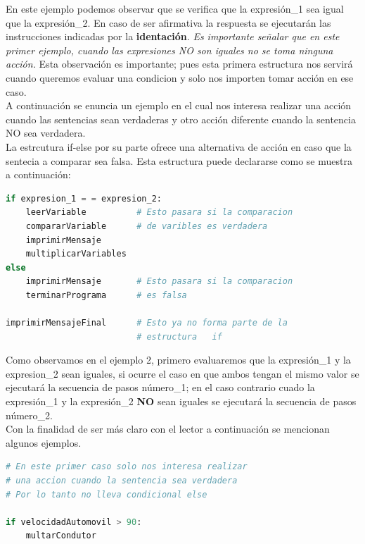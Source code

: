 \documentclass[a4paper, openright, 12pt]{article}
\begin{document}
    En este ejemplo podemos observar que se verifica que la expresión\_1 sea igual que la expresión\_2. En caso de ser afirmativa la respuesta se ejecutarán las instrucciones indicadas por la \textbf{identación}. \textit{Es importante señalar que en este primer ejemplo, cuando las expresiones NO son iguales no se toma ninguna acción.} Esta observación es importante; pues esta primera estructura nos servirá cuando queremos evaluar una condicion y solo nos importen tomar acción en ese caso.\\

    A continuación se enuncia un ejemplo en el cual nos interesa realizar una acción cuando las sentencias sean verdaderas y otro acción diferente cuando la sentencia NO sea verdadera.\\


    La estrcutura if-else por su parte ofrece una alternativa de acción en caso que la sentecia a comparar sea falsa. Esta estructura puede declararse como se muestra a continuación:\\

\begin{lstlisting}[language=Python]
if expresion_1 = = expresion_2:
    leerVariable          # Esto pasara si la comparacion
    compararVariable      # de varibles es verdadera
    imprimirMensaje
    multiplicarVariables
else
    imprimirMensaje       # Esto pasara si la comparacion
    terminarPrograma      # es falsa

imprimirMensajeFinal      # Esto ya no forma parte de la
                          # estructura   if
\end{lstlisting}


    Como observamos en el ejemplo 2, primero evaluaremos que la expresión\_1 y la expresion\_2 sean iguales, si ocurre el caso en que ambos tengan el mismo valor se ejecutará la secuencia de pasos número\_1; en el caso contrario cuado la expresión\_1 y la expresión\_2 \textbf{NO} sean iguales se ejecutará la secuencia de pasos número\_2.\\

    Con la finalidad de ser más claro con el lector a continuación se mencionan algunos ejemplos.\\

\begin{lstlisting}[language=Python]
# En este primer caso solo nos interesa realizar
# una accion cuando la sentencia sea verdadera
# Por lo tanto no lleva condicional else

if velocidadAutomovil > 90:
    multarCondutor
\end{lstlisting}
\end{document}
